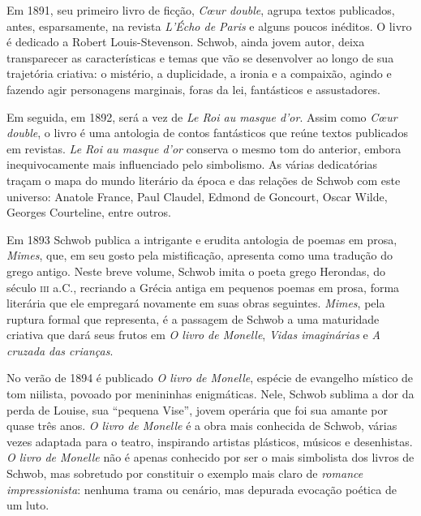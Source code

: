 Em 1891, seu primeiro livro de ficção, \textit{C\oe ur double}, agrupa textos
publicados, antes, esparsamente, na revista \textit{L’Écho de Paris} e
alguns poucos inéditos. O livro é dedicado a Robert Louis-Stevenson. Schwob,
ainda jovem autor, deixa transparecer as características e temas que vão se
desenvolver ao longo de sua trajetória criativa: o mistério, a duplicidade, a
ironia e a compaixão, agindo e fazendo agir personagens marginais, foras da
lei, fantásticos e assustadores.

Em seguida, em 1892, será a vez de \textit{Le Roi au masque d’or}. Assim
como \textit{C\oe ur double}, o livro é uma antologia de contos fantásticos que
reúne textos publicados em revistas. \textit{Le Roi
au masque d’or} conserva o mesmo tom do anterior, embora inequivocamente mais
influenciado pelo simbolismo. As várias dedicatórias traçam o mapa do mundo
literário da época e das relações de Schwob com este universo: Anatole France,
Paul Claudel, Edmond de Goncourt, Oscar Wilde, Georges Courteline, entre outros.

Em 1893 Schwob publica a intrigante e erudita antologia de poemas em prosa,
\textit{Mimes}, que, em seu gosto pela mistificação, apresenta como uma
tradução do grego antigo. Neste breve volume, Schwob imita o poeta grego
Herondas, do século \textsc{iii} a.C., recriando a Grécia antiga em pequenos poemas em
prosa, forma literária que ele empregará novamente em suas obras seguintes.
\textit{Mimes}, pela ruptura formal que representa, é a passagem de Schwob a uma 
maturidade criativa que
dará seus frutos em \textit{O livro de Monelle}, \textit{Vidas imaginárias} e 
\textit{A cruzada das crianças}.

No verão de 1894 é publicado \textit{O livro de Monelle},
espécie de evangelho místico de tom niilista, povoado por menininhas
enigmáticas. Nele, Schwob sublima a dor da perda de Louise, sua
“pequena Vise”, jovem operária que foi sua amante por quase três anos.
\textit{O livro de Monelle} é a obra mais conhecida de Schwob, várias vezes
adaptada para o teatro, inspirando artistas plásticos, músicos e desenhistas.
\textit{O livro de Monelle} não é apenas conhecido por ser o mais simbolista
dos livros de Schwob, mas sobretudo por constituir o exemplo mais claro de
\textit{romance impressionista}: nenhuma trama ou cenário, mas depurada
evocação poética de um luto.

